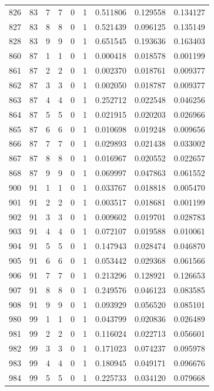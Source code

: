 \begin{longtable}{rrrrrrrrr}
826 & 83 & 7 & 7 & 0 & 1 & 0.511806 & 0.129558 & 0.134127 \\
827 & 83 & 8 & 8 & 0 & 1 & 0.521439 & 0.096125 & 0.135149 \\
828 & 83 & 9 & 9 & 0 & 1 & 0.651545 & 0.193636 & 0.163403 \\
860 & 87 & 1 & 1 & 0 & 1 & 0.000418 & 0.018578 & 0.001199 \\
861 & 87 & 2 & 2 & 0 & 1 & 0.002370 & 0.018761 & 0.009377 \\
862 & 87 & 3 & 3 & 0 & 1 & 0.002050 & 0.018787 & 0.009377 \\
863 & 87 & 4 & 4 & 0 & 1 & 0.252712 & 0.022548 & 0.046256 \\
864 & 87 & 5 & 5 & 0 & 1 & 0.021915 & 0.020203 & 0.026966 \\
865 & 87 & 6 & 6 & 0 & 1 & 0.010698 & 0.019248 & 0.009656 \\
866 & 87 & 7 & 7 & 0 & 1 & 0.029893 & 0.021438 & 0.033002 \\
867 & 87 & 8 & 8 & 0 & 1 & 0.016967 & 0.020552 & 0.022657 \\
868 & 87 & 9 & 9 & 0 & 1 & 0.069997 & 0.047863 & 0.061552 \\
900 & 91 & 1 & 1 & 0 & 1 & 0.033767 & 0.018818 & 0.005470 \\
901 & 91 & 2 & 2 & 0 & 1 & 0.003517 & 0.018681 & 0.001199 \\
902 & 91 & 3 & 3 & 0 & 1 & 0.009602 & 0.019701 & 0.028783 \\
903 & 91 & 4 & 4 & 0 & 1 & 0.072107 & 0.019588 & 0.010061 \\
904 & 91 & 5 & 5 & 0 & 1 & 0.147943 & 0.028474 & 0.046870 \\
905 & 91 & 6 & 6 & 0 & 1 & 0.053442 & 0.029368 & 0.061566 \\
906 & 91 & 7 & 7 & 0 & 1 & 0.213296 & 0.128921 & 0.126653 \\
907 & 91 & 8 & 8 & 0 & 1 & 0.249576 & 0.046123 & 0.083585 \\
908 & 91 & 9 & 9 & 0 & 1 & 0.093929 & 0.056520 & 0.085101 \\
980 & 99 & 1 & 1 & 0 & 1 & 0.043799 & 0.020836 & 0.026489 \\
981 & 99 & 2 & 2 & 0 & 1 & 0.116024 & 0.022713 & 0.056601 \\
982 & 99 & 3 & 3 & 0 & 1 & 0.171023 & 0.074237 & 0.095978 \\
983 & 99 & 4 & 4 & 0 & 1 & 0.180945 & 0.049171 & 0.096676 \\
984 & 99 & 5 & 5 & 0 & 1 & 0.225733 & 0.034120 & 0.079668 \\

\end{longtable}
